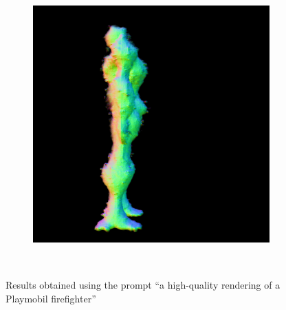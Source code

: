 \begin{figure}[ht]
\begin{subfigure}[b]{0.222\textwidth}
        \caption{}
    \end{subfigure}
    \begin{subfigure}[b]{0.222\textwidth}
        \centering
        \fontsize{9pt}{7pt}\selectfont{}\vspace{.1cm}
        \includegraphics[width=\textwidth]{etc/a robot made out of plants/magic123/magic123_coarse_robot_right_10000_part2.png}
        \caption{}
    \end{subfigure}
    \caption{Results obtained using the prompt ``a high-quality rendering of a Playmobil firefighter''}~\label{fig:resultPlaymobil}
\end{figure}



